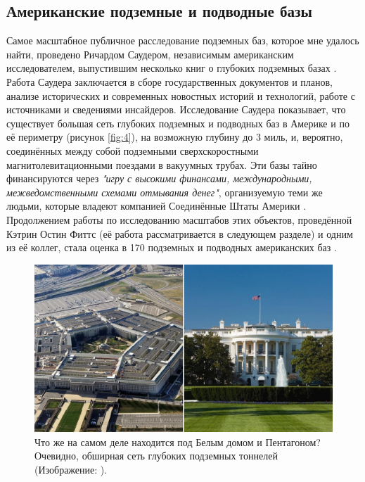 \documentclass[10pt,twocolumn,letterpaper]{article}
\begin{document}
\subsection{Американские подземные и подводные базы}

Самое масштабное публичное расследование подземных баз, которое мне удалось найти, проведено Ричардом Саудером, независимым американским исследователем, выпустившим несколько книг о глубоких подземных базах \cite{22}. Работа Саудера заключается в сборе государственных документов и планов, анализе исторических и современных новостных историй и технологий, работе с источниками и сведениями инсайдеров. Исследование Саудера показывает, что существует большая сеть глубоких подземных и подводных баз в Америке и по её периметру (рисунок \ref{fig:4}), на возможную глубину до 3 миль, и, вероятно, соединённых между собой подземными сверхскоростными магнитолевитационными поездами в вакуумных трубах. Эти базы тайно финансируются через \textit{"игру с высокими финансами, международными, межведомственными схемами отмывания денег"}, организуемую теми же людьми, которые владеют компанией Соединённые Штаты Америки \cite{22}. Продолжением работы по исследованию масштабов этих объектов, проведённой Кэтрин Остин Фиттс (её работа рассматривается в следующем разделе) и одним из её коллег, стала оценка в 170 подземных и подводных американских баз \cite{16,20}.

\begin{figure}[b]
\begin{center}
   \includegraphics[width=1\linewidth]{penta.jpg}
\end{center}
   \caption{Что же на самом деле находится под Белым домом и Пентагоном? Очевидно, обширная сеть глубоких подземных тоннелей (Изображение: \cite{31}).}
\label{fig:3}
\label{fig:onecol}
\end{figure}
\end{document}
